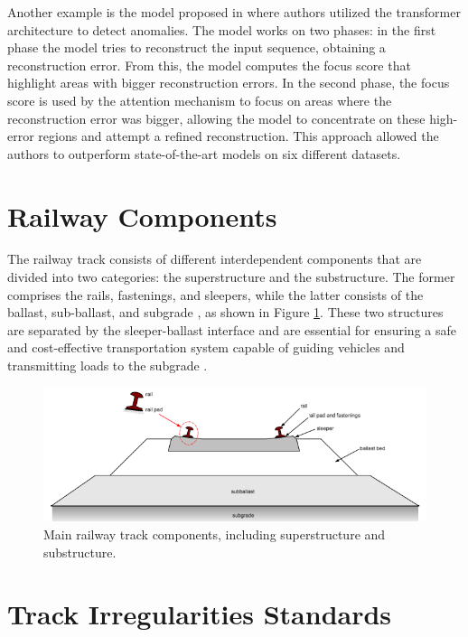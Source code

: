 Another example is the model proposed in \cite{tuli2022tranaddeeptransformernetworks} where authors utilized the transformer architecture to detect anomalies. The model works on two phases: in the first phase the model tries to reconstruct the input sequence, obtaining a reconstruction error. From this, the model computes the focus score that highlight areas with bigger reconstruction errors. In the second phase, the focus score is used by the attention mechanism to focus on areas where the reconstruction error was bigger, allowing the model to concentrate on these high-error regions and attempt a refined reconstruction. This approach allowed the authors to outperform state-of-the-art models on six different datasets.

\section{Railway Components}

The railway track consists of different interdependent components that are divided into two categories: the superstructure and the substructure. The former comprises the rails, fastenings, and sleepers, while the latter consists of the ballast, sub-ballast, and subgrade \cite{kaewunruen12008dynamic}, as shown in Figure \ref{fig:Track-Components}. These two structures are separated by the sleeper-ballast interface and are essential for ensuring a safe and cost-effective transportation system capable of guiding vehicles and transmitting loads to the subgrade \cite{attoh2017big}.

\begin{figure}[H]
    \centering
    \includegraphics[width=12cm]{Cap2_LitReview/Track Components/track_components.png}
    \caption{Main railway track components, including superstructure and substructure. \cite{kaewunruen12008dynamic}}
    \label{fig:Track-Components}
\end{figure}

\section{Track Irregularities Standards} \label{sec-track-defects}

